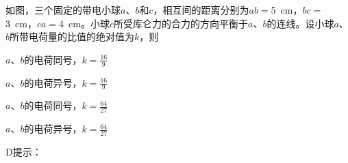 如图，三个固定的带电小球\(a\)、\(b\)和\(c\)，相互间的距离分别为\(ab = \)\qty{5}{cm}，\(bc =\)\qty{3}{cm}，\(ca =\)\qty{4}{cm}。小球\(c\)所受库仑力的合力的方向平衡于\(a\)、\(b\)的连线。设小球\(a\)、\(b\)所带电荷量的比值的绝对值为\(k\)，则\paren[]

\begin{choices}
	\item \(a\)、\(b\)的电荷同号，\(k = \frac{16}{9}\)
	\item \(a\)、\(b\)的电荷异号，\(k = \frac{16}{9}\)
	\item \(a\)、\(b\)的电荷同号，\(k = \frac{64}{27}\)
	\item \(a\)、\(b\)的电荷异号，\(k = \frac{64}{27}\)
\end{choices}
\begin{answer}
	D\quad 提示：
\end{answer}